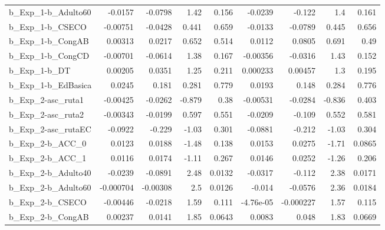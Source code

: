 \begin{tabular}{lrrrrrrrr}
b\_Exp\_1-b\_Adulto60         &     -0.0157 &      -0.0798 &      1.42 &    0.156 &    -0.0239 &      -0.122 &          1.4 &         0.161 \\
b\_Exp\_1-b\_CSECO            &    -0.00751 &      -0.0428 &     0.441 &    0.659 &    -0.0133 &     -0.0789 &        0.445 &         0.656 \\
b\_Exp\_1-b\_CongAB           &     0.00313 &       0.0217 &     0.652 &    0.514 &     0.0112 &      0.0805 &        0.691 &          0.49 \\
b\_Exp\_1-b\_CongCD           &    -0.00701 &      -0.0614 &      1.38 &    0.167 &   -0.00356 &     -0.0316 &         1.43 &         0.152 \\
b\_Exp\_1-b\_DT               &     0.00205 &       0.0351 &      1.25 &    0.211 &   0.000233 &     0.00457 &          1.3 &         0.195 \\
b\_Exp\_1-b\_EdBasica         &      0.0245 &        0.181 &     0.281 &    0.779 &     0.0193 &       0.148 &        0.284 &         0.776 \\
b\_Exp\_2-asc\_ruta1          &    -0.00425 &      -0.0262 &    -0.879 &     0.38 &   -0.00531 &     -0.0284 &       -0.836 &         0.403 \\
b\_Exp\_2-asc\_ruta2          &    -0.00343 &      -0.0199 &     0.597 &    0.551 &    -0.0209 &      -0.109 &        0.552 &         0.581 \\
b\_Exp\_2-asc\_rutaEC         &     -0.0922 &       -0.229 &     -1.03 &    0.301 &    -0.0881 &      -0.212 &        -1.03 &         0.304 \\
b\_Exp\_2-b\_ACC\_0            &      0.0123 &       0.0188 &     -1.48 &    0.138 &     0.0153 &      0.0275 &        -1.71 &        0.0865 \\
b\_Exp\_2-b\_ACC\_1            &      0.0116 &       0.0174 &     -1.11 &    0.267 &     0.0146 &      0.0252 &        -1.26 &         0.206 \\
b\_Exp\_2-b\_Adulto40         &     -0.0239 &      -0.0891 &      2.48 &   0.0132 &    -0.0317 &      -0.112 &         2.38 &        0.0171 \\
b\_Exp\_2-b\_Adulto60         &   -0.000704 &     -0.00308 &       2.5 &   0.0126 &     -0.014 &     -0.0576 &         2.36 &        0.0184 \\
b\_Exp\_2-b\_CSECO            &    -0.00446 &      -0.0218 &      1.59 &    0.111 &  -4.76e-05 &   -0.000227 &         1.57 &         0.115 \\
b\_Exp\_2-b\_CongAB           &     0.00237 &       0.0141 &      1.85 &   0.0643 &     0.0083 &       0.048 &         1.83 &        0.0669 \\

\end{tabular}
